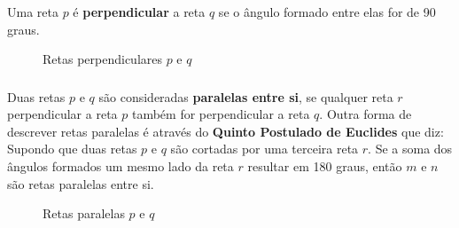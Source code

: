 \documentclass[handout]{beamer}
\begin{document}
\begin{frame}[fragile]\frametitle{\subsecname}
    Uma reta $p$ é \textbf{perpendicular} a reta $q$ se o ângulo formado entre elas for de 90 graus.
    \begin{figure}[H]
        \centering
        \caption{Retas perpendiculares $p$ e $q$}
    \end{figure}
\end{frame}


\begin{frame}[fragile]\frametitle{\subsecname}
    Duas retas $p$ e $q$ são consideradas \textbf{paralelas entre si}, se qualquer reta $r$ perpendicular a reta $p$ também for
    perpendicular a reta $q$. Outra forma de descrever retas paralelas é através do \textbf{Quinto Postulado de Euclides}
    que diz: Supondo que duas retas $p$ e $q$ são cortadas por uma terceira reta $r$. Se a soma dos ângulos formados um
    mesmo lado da reta $r$ resultar em 180 graus, então $m$ e $n$ são retas paralelas entre si.

    \begin{figure}[H]
        \centering
        \caption{Retas paralelas $p$ e $q$}
    \end{figure}
\end{frame}

\end{document}
